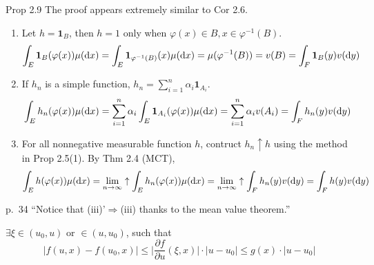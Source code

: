\begin{note}{Prop 2.9}
    The proof appears extremely similar to Cor 2.6.
    \begin{enumerate}
        \item[(Step 1)] Let $h=\mathbf{1}_B$, then $h=1$ only when $\varphi(x)\in B, x\in \varphi^{-1}(B)$.
        \[
        \int_E \mathbf{1}_B (\varphi(x))\mu(\mathop{}\!\mathrm{d} x)=\int_E \mathbf{1}_{\varphi^{-1}(B)} (x)\mu(\mathop{}\!\mathrm{d} x)=\mu(\varphi^{-1}(B))=v(B)=\int_F \mathbf{1}_B(y)v(\mathop{}\!\mathrm{d} y)
        \]
        \item[(Step 2)] If $h_n$ is a simple function, $h_n=\sum_{i=1}^n\alpha_i \mathbf{1}_{A_i}$.
        \[
        \int_E h_n(\varphi(x))\mu(\mathop{}\!\mathrm{d} x)
        =\sum_{i=1}^n \alpha_i\int_E \mathbf{1}_{A_i}(\varphi(x))\mu(\mathop{}\!\mathrm{d} x)
        =\sum_{i=1}^n\alpha_i v(A_i)
        =\int_F h_n(y)v(\mathop{}\!\mathrm{d} y)
        \]
        \item[(Step 3)] For all nonnegative measurable function $h$, contruct $h_n\uparrow h$ using the method in Prop 2.5(1). By Thm 2.4 (MCT),
        \[
        \int_E h(\varphi(x))\mu(\mathop{}\!\mathrm{d} x)
        =\lim_{n\to\infty}\uparrow \int_E h_n(\varphi(x))\mu(\mathop{}\!\mathrm{d} x)
        =\lim_{n\to\infty}\uparrow \int_F h_n(y)v(\mathop{}\!\mathrm{d} y)
        =\int_F h(y)v(\mathop{}\!\mathrm{d} y)
        \]
    \end{enumerate}
\end{note}

\begin{note}{p.~34}
    ``Notice that (iii)'$\Rightarrow$(iii) thanks to the mean value theorem.''

    $\exists\xi\in(u_0,u)$ or $\in (u,u_0)$, such that
    \[
    |f(u,x)-f(u_0,x)|\le \bigg|\frac{\partial f}{\partial u}(\xi,x)\bigg|\cdot |u-u_0|\le g(x)\cdot |u-u_0|
    \]
\end{note}